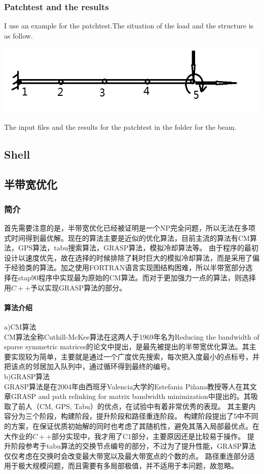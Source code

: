 \documentclass[UTF8]{ctexbook}
\begin{document}
\subsubsection{Patchtest and the results}
I use an example for the patchtest.The situation of the load and the structure is as follow.
\begin{center}
\includegraphics[width=1.0\textwidth]{beam7.png}
\end{center}
The input files and the results for the patchtest in the folder for the beam.
\subsection{Shell}

\subsection{半带宽优化}

\subsubsection{简介}
首先需要注意的是，半带宽优化已经被证明是一个NP完全问题，所以无法在多项式时间得到最优解。现在的算法主要是近似的优化算法，目前主流的算法有CM算法，GPS算法，tabu搜索算法，GRASP算法，模拟冷却算法等。
由于程序的最初设计以速度优先，故在选择的时候排除了耗时巨大的模拟冷却算法，而是采用了偏于经验类的算法。加之使用FORTRAN语言实现图结构困难，所以半带宽部分选择在stap90程序中实现最为原始的CM算法。而对于更加强力一点的算法，则选择用$C++$予以实现GRASP算法的部分。
\paragraph{算法介绍}
a)CM算法\\
CM算法全称Cuthill-McKee算法在这两人于1969年名为Reducing the bandwidth of sparse symmetric matrices的论文中提出，是最先被提出的半带宽优化算法。其主要实现较为简单，主要就是通过一个广度优先搜索，每次把入度最小的点标号，并把该点的邻居加入队列中，通过循环得到最终的编号。\\
b)GRASP算法\\
GRASP算法是在2004年由西班牙Valencia大学的Estefania Piñana教授等人在其文章GRASP and path relinking for matrix bandwidth minimization中提出的。其吸取了前人（CM, GPS, Tabu）的优点，在试验中有着非常优秀的表现。
其主要内容分为三个阶段，构建阶段，提升阶段和路径重连阶段。
构建阶段提出了5中不同的方案，在保证优质初始解的同时也考虑了其随机性，避免其落入局部最优点。在大作业的$C++$部分实现中，我才用了C1部分，主要原因还是比较易于操作。
提升阶段参考于tabu算法的交换节点编号的部分，不过为了提升性能，GRASP算法仅仅考虑在交换时会改变最大带宽以及最大带宽点的个数的点。
路径重连部分适用于极大规模问题，而且需要有多局部极值，并不适用于本问题，故忽略。
\end{document}
